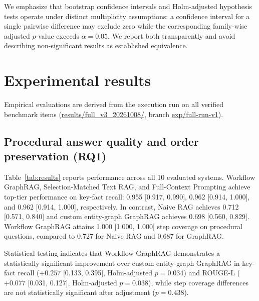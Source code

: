 \documentclass[preprint,10pt]{elsarticle}
\begin{document}
We emphasize that bootstrap confidence intervals and Holm-adjusted hypothesis tests operate under distinct multiplicity assumptions: a confidence interval for a single pairwise difference may exclude zero while the corresponding family-wise adjusted $p$-value exceeds $\alpha = 0.05$. We report both transparently and avoid describing non-significant results as established equivalence.

\section{Experimental results}
\label{sec:results}

Empirical evaluations are derived from the execution run on all \nVerified{} verified benchmark items (\url{results/full_v3_20261008/}, branch \url{exp/full-run-v1}).

\subsection{Procedural answer quality and order preservation (RQ1)}
Table~\ref{tab:results} reports performance across all 10 evaluated systems. Workflow GraphRAG, Selection-Matched Text RAG, and Full-Context Prompting achieve top-tier performance on key-fact recall: 0.955 [0.917, 0.990], 0.962 [0.914, 1.000], and 0.962 [0.914, 1.000], respectively. In contrast, Naive RAG achieves 0.712 [0.571, 0.840] and custom entity-graph GraphRAG achieves 0.698 [0.560, 0.829]. Workflow GraphRAG attains 1.000 [1.000, 1.000] step coverage on procedural questions, compared to 0.727 for Naive RAG and 0.687 for GraphRAG.

\begin{table}[!htbp]
\centering
\caption{Summary of evaluation results across ten system configurations. Key-fact recall (KFR) and false refusal rate are evaluated on 35 answerable questions; procedural metrics (Coverage, TIR, AMR) on 11 procedural questions; refusal accuracy on 5 unanswerable questions; and prompt tokens on all 40 questions. Values are point estimates; full bootstrap 95\% confidence intervals are reported in Appendix~\ref{app:full-results}. TIR: Topological Inversion Rate; AMR: Actor Mismatch Rate.}
\label{tab:results}
\small
\setlength{\tabcolsep}{2pt}
\resizebox{\textwidth}{!}{%
}
\end{table}

Statistical testing indicates that Workflow GraphRAG demonstrates a statistically significant improvement over custom entity-graph GraphRAG in key-fact recall ($+0.257$ [0.133, 0.395], Holm-adjusted $p=0.034$) and ROUGE-L ($+0.077$ [0.031, 0.127], Holm-adjusted $p=0.038$), while step coverage differences are not statistically significant after adjustment ($p=0.438$).
\end{document}
